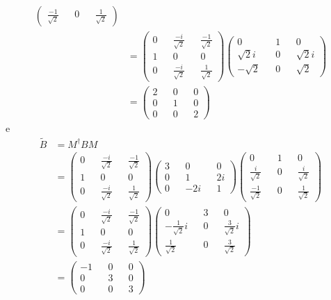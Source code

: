 \documentclass[a4paper, 12pt, notitlepage]{article}
\begin{document}
\begin{enumerate}
\begin{enumerate}[(A)]
\begin{align*}
\begin{pmatrix}
  \frac{-1}{\sqrt{2}} && 0 && \frac{1}{\sqrt{2}}
  \end{pmatrix} \\
  &= \begin{pmatrix}
  0 && \frac{-i}{\sqrt{2}} && \frac{-1}{\sqrt{2}} \\
  1 && 0 && 0 \\
  0 && \frac{-i}{\sqrt{2}} && \frac{1}{\sqrt{2}}
  \end{pmatrix}\begin{pmatrix}
  0 && 1 && 0 \\
  \sqrt{2}i && 0 && \sqrt{2}i \\
  -\sqrt{2} && 0 && \sqrt{2}
  \end{pmatrix} \\
  &= \begin{pmatrix}
    2 && 0 && 0 \\
    0 && 1 && 0 \\
    0 && 0 && 2
  \end{pmatrix}
  \end{align*}
  \noindent e
  \begin{align*}
  \tilde{B} &= M^\dagger B M \\
  &= \begin{pmatrix}
  0 && \frac{-i}{\sqrt{2}} && \frac{-1}{\sqrt{2}} \\
  1 && 0 && 0 \\
  0 && \frac{-i}{\sqrt{2}} && \frac{1}{\sqrt{2}}
  \end{pmatrix}\begin{pmatrix}
  3 && 0 && 0 \\
  0 && 1 && 2i \\
  0 && -2i && 1
  \end{pmatrix}\begin{pmatrix}
  0 && 1 && 0 \\
  \frac{i}{\sqrt{2}} && 0 && \frac{i}{\sqrt{2}} \\
  \frac{-1}{\sqrt{2}} && 0 && \frac{1}{\sqrt{2}}
  \end{pmatrix} \\
  &= \begin{pmatrix}
  0 && \frac{-i}{\sqrt{2}} && \frac{-1}{\sqrt{2}} \\
  1 && 0 && 0 \\
  0 && \frac{-i}{\sqrt{2}} && \frac{1}{\sqrt{2}}
  \end{pmatrix}\begin{pmatrix}
  0 && 3 && 0\\
  -\frac{1}{\sqrt{2}}i && 0 && \frac{3}{\sqrt{2}}i \\
  \frac{1}{\sqrt{2}} && 0 && \frac{3}{\sqrt{2}}
  \end{pmatrix} \\
  &= \begin{pmatrix}
  -1 && 0 && 0 \\
  0 && 3 && 0 \\
  0 && 0 && 3
  \end{pmatrix}
  \end{align*}


\end{enumerate}
\end{enumerate}
\end{document}
